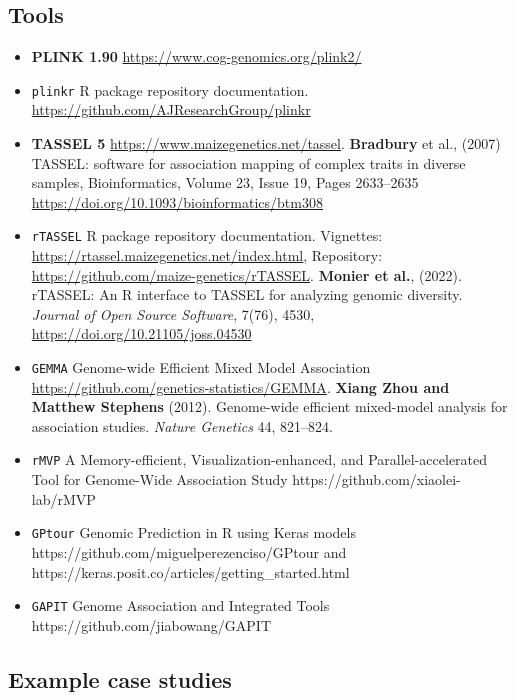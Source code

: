\hypertarget{tools}{%
  \subsection{Tools}\label{tools}}

\begin{itemize}
  \item
        \textbf{PLINK 1.90} \url{https://www.cog-genomics.org/plink2/}
  \item
        \texttt{plinkr} R package repository documentation.
        \url{https://github.com/AJResearchGroup/plinkr}
  \item
        \textbf{TASSEL 5} \url{https://www.maizegenetics.net/tassel}.
        \textbf{Bradbury} et al., (2007) TASSEL: software for association
        mapping of complex traits in diverse samples, Bioinformatics, Volume
        23, Issue 19, Pages 2633--2635
        \url{https://doi.org/10.1093/bioinformatics/btm308}
  \item
        \texttt{rTASSEL} R package repository documentation. Vignettes:
        \url{https://rtassel.maizegenetics.net/index.html}, Repository:
        \url{https://github.com/maize-genetics/rTASSEL}. \textbf{Monier et
          al.}, (2022). rTASSEL: An R interface to TASSEL for analyzing genomic
        diversity. \emph{Journal of Open Source Software}, 7(76), 4530,
        \url{https://doi.org/10.21105/joss.04530}
  \item
        \texttt{GEMMA} Genome-wide Efficient Mixed Model Association
        \url{https://github.com/genetics-statistics/GEMMA}. \textbf{Xiang Zhou
          and Matthew Stephens} (2012). Genome-wide efficient mixed-model
        analysis for association studies. \emph{Nature Genetics} 44, 821--824.
  \item
        \texttt{rMVP} A Memory-efficient, Visualization-enhanced, and
        Parallel-accelerated Tool for Genome-Wide Association Study
        https://github.com/xiaolei-lab/rMVP
  \item
        \texttt{GPtour} Genomic Prediction in R using Keras models
        https://github.com/miguelperezenciso/GPtour and
        https://keras.posit.co/articles/getting\_started.html
  \item
        \texttt{GAPIT} Genome Association and Integrated Tools
        https://github.com/jiabowang/GAPIT
\end{itemize}

\hypertarget{example-case-studies}{%
  \subsection{Example case studies}\label{example-case-studies}}

